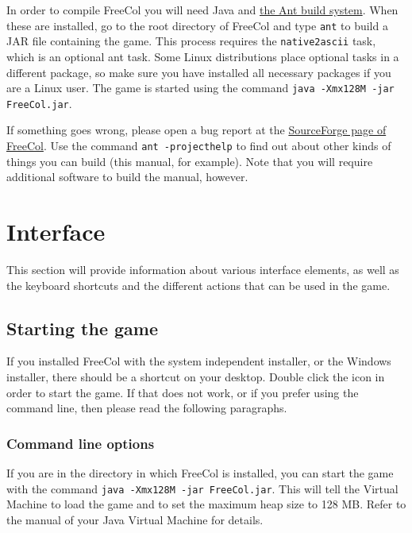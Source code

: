 \documentclass[12pt]{book}
\begin{document}
In order to compile FreeCol you will need Java and
\href{http://ant.apache.org/}{the Ant build system}. When these are
installed, go to the root directory of FreeCol and type \verb$ant$ to
build a JAR file containing the game. This process requires the
\verb$native2ascii$ task, which is an optional ant
task. Some Linux distributions place optional tasks in a different
package, so make sure you have installed all necessary packages if you
are a Linux user. The game is started using the command
\verb$java -Xmx128M -jar FreeCol.jar$.

If something goes wrong, please open a bug report at the
\href{http://sourceforge.net/projects/freecol}{SourceForge page of
  FreeCol}. Use the command \verb$ant -projecthelp$ to find out
about other kinds of things you can build (this manual, for
example). Note that you will require additional software to build the
manual, however.


\hypertarget{Interface}{\chapter{Interface}}

This section will provide information about various interface
elements, as well as the keyboard shortcuts and the different actions
that can be used in the game.

\hypertarget{Starting the game}{\section{Starting the game}}

If you installed FreeCol with the system independent installer, or the
Windows installer, there should be a shortcut on your desktop. Double
click the icon in order to start the game. If that does not work, or
if you prefer using the command line, then please read the following
paragraphs.


\hypertarget{Command line options}{\subsection{Command line options}}

If you are in the directory in which FreeCol is installed, you can
start the game with the command \verb$java -Xmx128M -jar FreeCol.jar$.
This will tell the Virtual Machine to load the game and to set the
maximum heap size to 128 MB. Refer to the manual of your Java Virtual
Machine for details.
\end{document}
